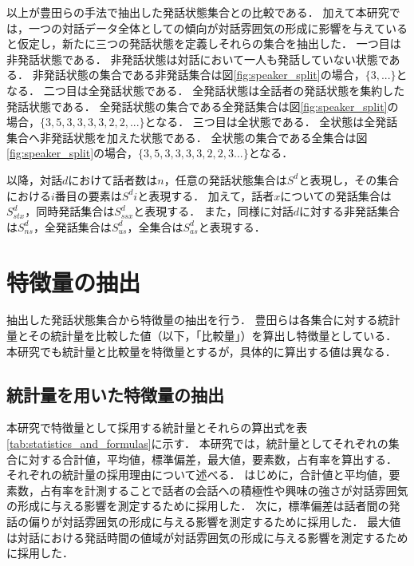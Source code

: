 以上が豊田らの手法で抽出した発話状態集合との比較である．
加えて本研究では，一つの対話データ全体としての傾向が対話雰囲気の形成に影響を与えていると仮定し，新たに三つの発話状態を定義しそれらの集合を抽出した．
一つ目は非発話状態である．
非発話状態は対話において一人も発話していない状態である．
非発話状態の集合である非発話集合は図\ref{fig:speaker_split}の場合，$\{3, ...\}$となる．
二つ目は全発話状態である．
全発話状態は全話者の発話状態を集約した発話状態である．
全発話状態の集合である全発話集合は図\ref{fig:speaker_split}の場合，$\{3, 5, 3, 3, 3, 3, 2, 2, ...\}$となる．
三つ目は全状態である．
全状態は全発話集合へ非発話状態を加えた状態である．
全状態の集合である全集合は図\ref{fig:speaker_split}の場合，$\{3, 5, 3, 3, 3, 3, 2, 2, 3 ...\}$となる．

以降，対話$d$におけて話者数は$n$，任意の発話状態集合は$S^d$と表現し，その集合における$i$番目の要素は$S^di$と表現する．
加えて，話者$x$についての発話集合は$S^d_{stx}$，同時発話集合は$S^d_{ssx}$と表現する．
また，同様に対話$d$に対する非発話集合は$S^d_{ns}$，全発話集合は$S^d_{us}$，全集合は$S^d_{as}$と表現する．

\section{特徴量の抽出\label{node:pickup_feature}}

抽出した発話状態集合から特徴量の抽出を行う．
豊田らは各集合に対する統計量とその統計量を比較した値（以下，「比較量」）を算出し特徴量としている．
本研究でも統計量と比較量を特徴量とするが，具体的に算出する値は異なる．

\subsection{統計量を用いた特徴量の抽出}

本研究で特徴量として採用する統計量とそれらの算出式を表\ref{tab:statistics_and_formulas}に示す．
本研究では，統計量としてそれぞれの集合に対する合計値，平均値，標準偏差，最大値，要素数，占有率を算出する．
それぞれの統計量の採用理由について述べる．
はじめに，合計値と平均値，要素数，占有率を計測することで話者の会話への積極性や興味の強さが対話雰囲気の形成に与える影響を測定するために採用した．
次に，標準偏差は話者間の発話の偏りが対話雰囲気の形成に与える影響を測定するために採用した．
最大値は対話における発話時間の値域が対話雰囲気の形成に与える影響を測定するために採用した．

